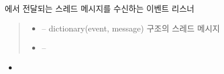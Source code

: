 \documentclass[a4paper,10pt,english]{sphinxmanual}
\begin{document}
\begin{fulllineitems}
\begin{fulllineitems}
\end{fulllineitems}


\begin{fulllineitems}
\label{\detokenize{_RMSync:RMSync._dhDaemonListener}}
\pysigstartsignatures
{}
\pysigstopsignatures
\sphinxAtStartPar
{\hyperref[\detokenize{_DHDaemon:dhdaemon}]{}} 에서 전달되는 스레드 메시지를 수신하는 이벤트 리스너
\begin{quote}\begin{description}
\begin{itemize}
\item {} 
\sphinxAtStartPar
{} – dictionary(event, message) 구조의 스레드 메시지

\item {} 
\sphinxAtStartPar
{} – 

\end{itemize}

\end{description}\end{quote}


\nopagebreak

\begin{itemize}
\item {} 
\sphinxAtStartPar
{\hyperref[\detokenize{_DHDaemon:DHDaemon._rmSyncInit}]{}}

\end{itemize}



\end{fulllineitems}



\end{fulllineitems}
\end{document}
